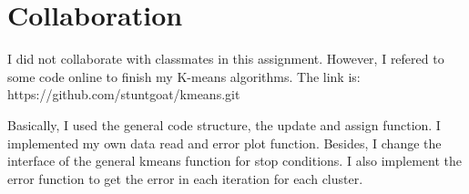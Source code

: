\documentclass{article} %
\begin{document}
\section{Collaboration}
I did not collaborate with classmates in this assignment. However, I refered to
some code online to finish my K-means algorithms. The link is:
https://github.com/stuntgoat/kmeans.git

Basically, I used the general code structure, the update and assign function.
I implemented my own data read and error plot function. Besides, I change the
interface of the general kmeans function for stop conditions. I also implement
the error function to get the error in each iteration for each cluster.
\end{document}
